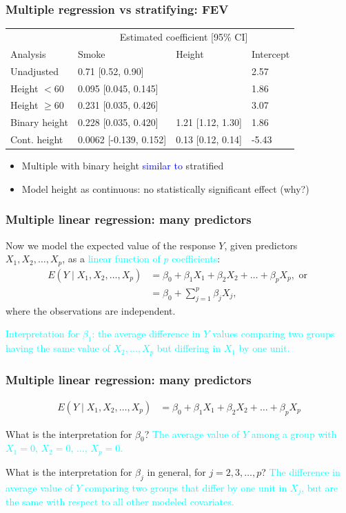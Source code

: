 \documentclass[12pt, 
hyperref={colorlinks=true, linkcolor=blue, urlcolor=cyan},dvipsnames]{beamer}
\begin{document}
\begin{frame}
\frametitle{Multiple regression vs stratifying: FEV}
\vspace{-1cm}\hspace*{-0.75cm}\begin{tabular}{llll}
& \multicolumn{3}{c}{Estimated coefficient [95\% CI]} \\
Analysis & Smoke & Height & Intercept \\
\hline
Unadjusted  & 0.71 [0.52, 0.90] & & 2.57\\
Height $< 60$ & 0.095 [0.045, 0.145]& & 1.86\\
Height $\geq 60$ & 0.231 [0.035, 0.426]& & 3.07 \\
Binary height & 0.228 [0.035, 0.420] & 1.21 [1.12, 1.30] & 1.86\\
Cont. height & 0.0062 [-0.139, 0.152]& 0.13 [0.12, 0.14] & -5.43
\end{tabular}

\begin{itemize}
\item Multiple with binary height \textcolor{blue}{similar to} stratified
\item Model height as continuous: no statistically significant effect (why?)
\end{itemize} 
\end{frame}

\begin{frame}
\frametitle{Multiple linear regression: many predictors}
Now we model the expected value of the response $Y$, given predictors $X_1, X_2, \dots, X_p$, as a \textcolor{cyan}{linear function of $p$ coefficients}:
\begin{align*}
E(Y \mid X_1, X_2, \dots, X_p) &= \beta_0 + \beta_1 X_1 + \beta_2 X_2 + \dots + \beta_p X_p, \text{ or } \\
&= \beta_0 + \sum_{j=1}^p \beta_j X_j,
\end{align*} 
where the observations are independent.

\textcolor{cyan}{Interpretation for $\beta_1$: the average difference in $Y$ values comparing two groups having the same value of $X_2, \dots, X_p$ but differing in $X_1$ by one unit.}

\end{frame}

\begin{frame}
\frametitle{Multiple linear regression: many predictors}
\begin{align*}
E(Y \mid X_1, X_2, \dots, X_p) &= \beta_0 + \beta_1 X_1 + \beta_2 X_2 + \dots + \beta_p X_p
\end{align*}

What is the interpretation for $\beta_0$? \pause \textcolor{cyan}{The average value of $Y$ among a group with $X_1 = 0$, $X_2 = 0$, $\dots$, $X_p = 0$.} \pause

What is the interpretation for $\beta_j$ in general, for $j = 2, 3, \dots, p$? \pause \textcolor{cyan}{The difference in average value of $Y$ comparing two groups that differ by one unit in $X_j$, but are the same with respect to all other modeled covariates.}

\end{frame}
\end{document}
